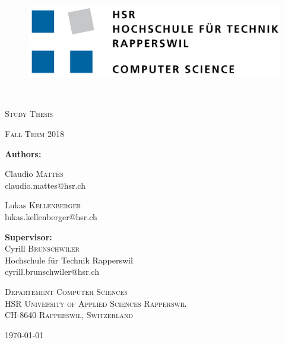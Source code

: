 \begin{titlepage}
	\centering
	\begin{figure}
		\centering
		\includegraphics[width=0.7\linewidth]{./assets/logo/hsr.png}  	
	\end{figure}
	\
	\vfill
	{\huge\bfseries \TITLE\par}
	\vspace{5mm}
	{\scshape\Large Study Thesis\par}
	\vspace{2mm}
	{\scshape\small Fall Term 2018}
	\vfill

	{\Large\textbf{Authors:} \\\vspace{0.2cm}}
	{\Large Claudio \textsc{Mattes} \\\small claudio.mattes@hsr.ch \par\vspace{0.2cm}
	\Large Lukas \textsc{Kellenberger} \\\small lukas.kellenberger@hsr.ch}

	\vspace{0.6cm}
	{\Large\textbf{Supervisor:} \\\vspace{0.2cm}}
	Cyrill \textsc{Brunschwiler}  \\ {\small Hochschule für Technik Rapperswil} \\\small cyrill.brunschwiler@hsr.ch \\


	\vfill
	{\scshape\scriptsize Departement Computer Sciences \\ HSR University of Applied Sciences Rapperswil \\ CH-8640 Rapperswil, Switzerland \par}
	\vfill

    {\large \today}
\end{titlepage}